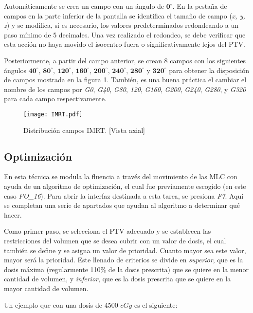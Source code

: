 \documentclass{article}
\begin{document}
Automáticamente se crea un campo con un ángulo de $\mathbf{0^{\circ}}$. En la pestaña de campos en la parte inferior de la pantalla se identifica el tamaño de campo (\textit{x, y, z}) y se modifica, si es necesario, los valores predeterminados redondeando a un paso mínimo de 5 decimales. Una vez realizado el redondeo, se debe verificar que esta acción no haya movido el isocentro fuera o significativamente lejos del PTV.

Posteriormente, a partir del campo anterior, se crean 8 campos con los siguientes ángulos $\mathbf{40^{\circ}}$, $\mathbf{80^{\circ}}$, $\mathbf{120^{\circ}}$, $\mathbf{160^{\circ}}$, $\mathbf{200^{\circ}}$, $\mathbf{240^{\circ}}$, $\mathbf{280^{\circ}}$ y $\mathbf{320^{\circ}}$ para obtener la disposición de campos mostrada en la figura \ref{IMRT}. También, es una buena práctica el cambiar el nombre de los campos por \textit{G0}, \textit{G40}, \textit{G80}, \textit{120}, \textit{G160}, \textit{G200}, \textit{G240}, \textit{G280}, y \textit{G320} para cada campo respectivamente.

\begin{figure}[!ht]
    \centering
    \texttt{[image: IMRT.pdf]}
    \caption{Distribución campos IMRT. [Vista axial]}
    \label{IMRT}
\end{figure}

\subsection{Optimización}

En esta técnica se modula la fluencia a través del movimiento de las MLC con ayuda de un algoritmo de optimización, el cual fue previamente escogido (en este caso \textit{PO\_16}). Para abrir la interfaz destinada a esta tarea, se presiona \textit{F7}. Aquí se completan una serie de apartados que ayudan al algoritmo a determinar qué hacer.

Como primer paso, se selecciona el PTV adecuado y se establecen las restricciones del volumen que se desea cubrir con un valor de dosis, el cual también se define y se asigna un valor de prioridad. Cuanto mayor sea este valor, mayor será la prioridad. Este llenado de criterios se divide en \textit{superior}, que es la dosis máxima (regularmente 110\% de la dosis prescrita) que se quiere en la menor cantidad de volumen, y \textit{inferior}, que es la dosis prescrita que se quiere en la mayor cantidad de volumen.

Un ejemplo que con una dosis de 4500 $cGy$ es el siguiente:
\end{document}

